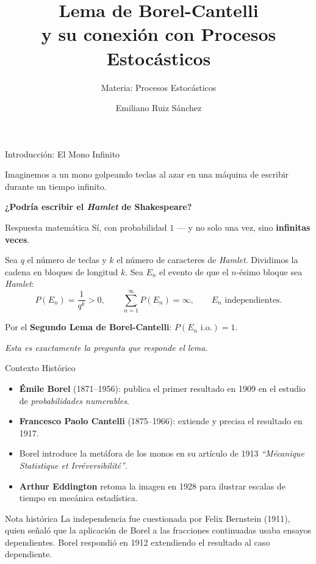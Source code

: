 \documentclass[11pt]{beamer}
\title[Lema de Borel-Cantelli]{Lema de Borel-Cantelli\\y su conexión con Procesos Estocásticos}
\subtitle{Materia: Procesos Estocásticos}
\author{Emiliano Ruiz Sánchez}
\institute{Facultad de Estudios Superiores Acatlán \\ Universidad Nacional Autónoma de México}
\date{}
\newcommand{\io}{\text{ i.o.}}
\begin{document}
\begin{frame}
  \titlepage
\end{frame}

\begin{frame}{Introducción: El Mono Infinito}

  Imaginemos a un mono golpeando teclas al azar en una máquina de escribir
  durante un tiempo infinito.

  \bigskip

  \textbf{¿Podría escribir el \textit{Hamlet} de Shakespeare?}

  \bigskip

  \begin{block}{Respuesta matemática}
    Sí, con probabilidad $1$ --- y no solo una vez, sino \textbf{infinitas veces}.
  \end{block}

  \bigskip

  Sea $q$ el número de teclas y $k$ el número de caracteres de \textit{Hamlet}.
  Dividimos la cadena en bloques de longitud $k$. Sea $E_n$ el evento de que
  el $n$-ésimo bloque sea \textit{Hamlet}:
  \[
    P(E_n) = \frac{1}{q^k} > 0, \qquad
    \sum_{n=1}^{\infty} P(E_n) = \infty, \qquad
    E_n \text{ independientes.}
  \]

  \medskip
  Por el \textbf{Segundo Lema de Borel-Cantelli}: $P(E_n \io) = 1$.

  \medskip
  \textit{Esta es exactamente la pregunta que responde el lema.}

\end{frame}

\begin{frame}{Contexto Histórico}

  \begin{itemize}
    \item \textbf{Émile Borel} (1871--1956): publica el primer resultado en
          1909 en el estudio de \textit{probabilidades numerables}.
    \item \textbf{Francesco Paolo Cantelli} (1875--1966): extiende y precisa
          el resultado en 1917.
    \item Borel introduce la metáfora de los monos en su artículo de 1913
          \textit{``Mécanique Statistique et Irréversibilité''}.
    \item \textbf{Arthur Eddington} retoma la imagen en 1928 para ilustrar
          escalas de tiempo en mecánica estadística.
  \end{itemize}

  \bigskip

  \begin{alertblock}{Nota histórica}
    La independencia fue cuestionada por Felix Bernstein (1911), quien
    señaló que la aplicación de Borel a las fracciones continuadas usaba
    ensayos dependientes. Borel respondió en 1912 extendiendo el resultado
    al caso dependiente.
  \end{alertblock}

\end{frame}
\end{document}
